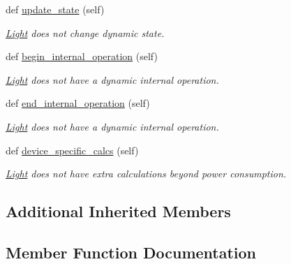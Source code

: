 \begin{DoxyCompactItemize}
\mbox{\label{class_build_1_1_objects_1_1light_1_1_light_a2658c7e30fc3fa388033e2bb4ff14442}} 
def \hyperlink{class_build_1_1_objects_1_1light_1_1_light_a2658c7e30fc3fa388033e2bb4ff14442}{update\+\_\+state} (self)
\begin{DoxyCompactList}\small\item\em \hyperlink{class_build_1_1_objects_1_1light_1_1_light}{Light} does not change dynamic state. \end{DoxyCompactList}\item 
def \hyperlink{class_build_1_1_objects_1_1light_1_1_light_ad11a8dcdfa51caa4133e2e3b68ee2e3f}{begin\+\_\+internal\+\_\+operation} (self)
\begin{DoxyCompactList}\small\item\em \hyperlink{class_build_1_1_objects_1_1light_1_1_light}{Light} does not have a dynamic internal operation. \end{DoxyCompactList}\item 
def \hyperlink{class_build_1_1_objects_1_1light_1_1_light_a42cd8cee6c1f83d8ef053f095f852056}{end\+\_\+internal\+\_\+operation} (self)
\begin{DoxyCompactList}\small\item\em \hyperlink{class_build_1_1_objects_1_1light_1_1_light}{Light} does not have a dynamic internal operation. \end{DoxyCompactList}\item 
def \hyperlink{class_build_1_1_objects_1_1light_1_1_light_a5b2b078fd97d8bc80262f57d1e97377d}{device\+\_\+specific\+\_\+calcs} (self)
\begin{DoxyCompactList}\small\item\em \hyperlink{class_build_1_1_objects_1_1light_1_1_light}{Light} does not have extra calculations beyond power consumption. \end{DoxyCompactList}\end{DoxyCompactItemize}
\subsection*{Additional Inherited Members}


\subsection{Member Function Documentation}
\mbox{\label{class_build_1_1_objects_1_1light_1_1_light_ad11a8dcdfa51caa4133e2e3b68ee2e3f}} 
